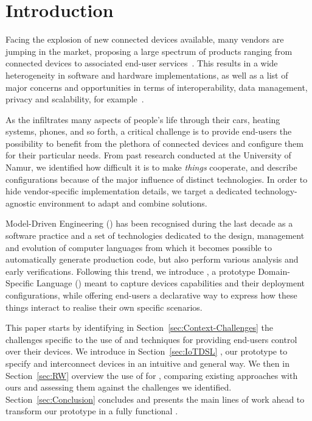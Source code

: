 \section{Introduction}
\label{sec:Introduction}

Facing the explosion of new connected devices available, many vendors are jumping in the market, proposing a large spectrum of products ranging from connected devices to associated end-user services~\cite{lee-15}. This results in a wide heterogeneity in software and hardware implementations, as well as a list of major concerns and opportunities in terms of interoperability, data management, privacy and scalability, for example~\cite{chaqfeh-12}.

As the \IOT infiltrates many aspects of people's life through their cars, heating systems, phones, and so forth, a critical challenge is to provide end-users the possibility to benefit from the plethora of connected devices and configure them for their particular needs. From past research conducted at the University of Namur, we identified how difficult it is to make \textit{things} cooperate, and describe configurations because of the major influence of distinct technologies. In order to hide vendor-specific implementation details, we target a dedicated technology-agnostic environment to adapt and combine \IOT solutions.

Model-Driven Engineering (\MDE) has been recognised during the last decade as a software practice and a set of technologies dedicated to the design, management and evolution of computer languages from which it becomes possible to automatically generate production code, but also perform various analysis and early verifications. Following this trend, we introduce \IOTDSL, a prototype Domain-Specific Language (\DSL) meant to capture \IOT devices capabilities and their deployment configurations, while offering end-users a declarative way to express how these things interact to realise their own specific scenarios.

This paper starts by identifying in Section~\ref{sec:Context-Challenges} the \IOT challenges specific to the use of \DSLS and \MDE techniques for providing end-users control over their devices. We introduce in Section~\ref{sec:IoTDSL} \IOTDSL, our prototype \DSL to specify and interconnect devices in an intuitive and general way. We then in Section~\ref{sec:RW} overview the use of \DSLS for \IOT, comparing existing approaches with ours and assessing them against the challenges we identified. Section~\ref{sec:Conclusion} concludes and presents the main lines of work ahead to transform our prototype in a fully functional \DSL.